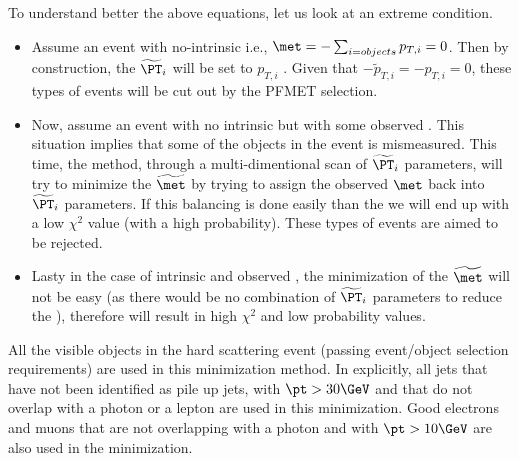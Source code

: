 To understand better the above equations, let us look at an extreme condition. 
\begin{itemize}
\item Assume an event with no-intrinsic \met i.e., $\met = -\sum_{i=objects} p_{T,i} = 0$. Then by construction, the $\widetilde{\PT}_i$ will be set to $p_{T,i}$ . Given that $-\widetilde{p}_{T,i} = - p_{T,i} = 0$, these types of events will be cut out by the PFMET selection.
\item Now, assume an event with no intrinsic \met but with some observed \met. This situation implies that some of the objects in the event is mismeasured. This time, the method, through a multi-dimentional scan of $\widetilde{\PT}_i$ parameters, will try to minimize the $\widetilde{\met}$ by trying to assign the observed $\met$ back into $\widetilde{\PT}_i$ parameters. If this balancing is done easily than the we will end up with a low $\chi^{2}$ value (with a high probability). These types of events are aimed to be rejected.
\item Lasty in the case of intrinsic \met and observed \met, the minimization of the $\widetilde{\met}$ will not be easy (as there would be no combination of $\widetilde{\PT}_i$ parameters to reduce the \met), therefore will result in high $\chi^2$ and low probability values. 
\end{itemize}

All the visible objects in the hard scattering event (passing event/object selection requirements) are used in this minimization method. In explicitly, all jets that have not been identified as pile up jets, with $\pt > 30 \GeV$ and that do not overlap with a photon or a lepton are used in this minimization. Good electrons and muons that are not overlapping with a photon and with $\pt > 10 \GeV$ are also used in the minimization. 

